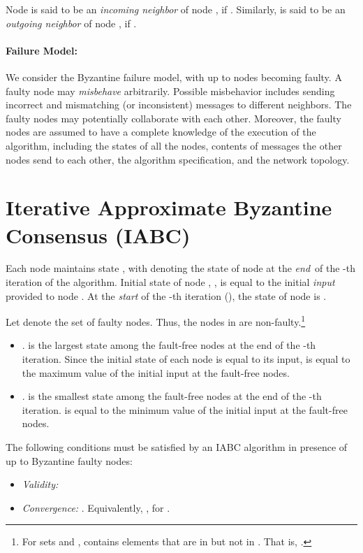 \documentclass[letterpaper, 12pt]{article}
\begin{document}
Node  is said to be an {\em incoming neighbor} of node ,
if . Similarly,  is said to be an {\em outgoing neighbor}
of node , if .


\paragraph{Failure Model:}
We consider the Byzantine failure model, with up to  nodes becoming faulty. A faulty node may {\em misbehave} arbitrarily. Possible misbehavior includes sending incorrect and mismatching (or inconsistent) messages to different neighbors. The faulty nodes may potentially collaborate with each other. Moreover, the faulty nodes are assumed to have a complete knowledge of the execution of
the algorithm, including the states of all the nodes,
contents of messages the other nodes send to each other,
the algorithm specification, and the network topology.

\section{Iterative Approximate Byzantine Consensus (IABC)}
\label{sec:iabc}

Each node  maintains state , with  denoting the state
of node  at the {\em end}\, of the -th iteration of the algorithm.
Initial state of node ,
, is equal to the initial {\em input}\, provided to node .
At the {\em start} of the -th iteration (), the state of
node  is .

Let  denote the set of faulty nodes.
Thus, the nodes
in  are non-faulty.\footnote{\normalsize For sets  and ,  contains elements that are in  but not in . That is, .} 
\begin{itemize}


\item .  is the largest state among the fault-free nodes at the end of the -th iteration.
Since the initial state of each node is equal to its input,
 is equal to the maximum value of the initial input at the fault-free nodes.

\item .  is the smallest state among the fault-free nodes at the end of the -th iteration.
 is equal to the minimum value of the initial input at the
fault-free nodes.
\end{itemize}
The following conditions must be satisfied by an IABC algorithm
in presence of up to  Byzantine faulty nodes:
\begin{itemize}
\item {\em Validity:} 

\item {\em Convergence:} .
Equivalently, , for
.
\end{itemize}
\end{document}
